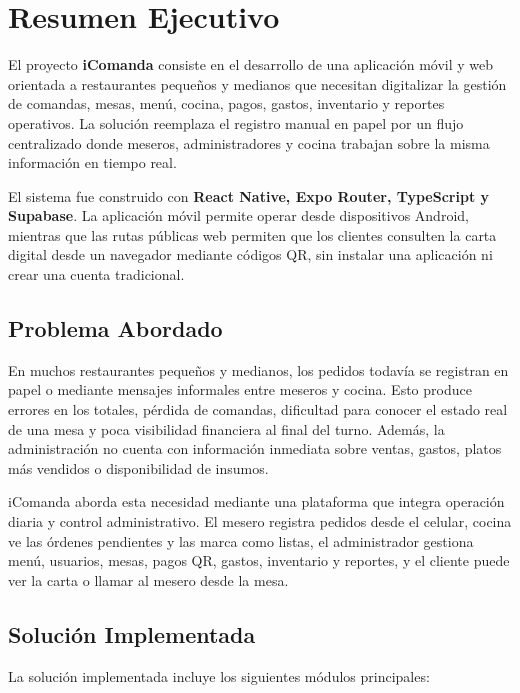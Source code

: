 \chapter{Resumen Ejecutivo}

El proyecto \textbf{iComanda} consiste en el desarrollo de una aplicación móvil
y web orientada a restaurantes pequeños y medianos que necesitan digitalizar la
gestión de comandas, mesas, menú, cocina, pagos, gastos, inventario y reportes
operativos. La solución reemplaza el registro manual en papel por un flujo
centralizado donde meseros, administradores y cocina trabajan sobre la misma
información en tiempo real.

El sistema fue construido con \textbf{React Native, Expo Router, TypeScript y
Supabase}. La aplicación móvil permite operar desde dispositivos Android, mientras
que las rutas públicas web permiten que los clientes consulten la carta digital
desde un navegador mediante códigos QR, sin instalar una aplicación ni crear una
cuenta tradicional.

\section{Problema Abordado}

En muchos restaurantes pequeños y medianos, los pedidos todavía se registran en
papel o mediante mensajes informales entre meseros y cocina. Esto produce errores
en los totales, pérdida de comandas, dificultad para conocer el estado real de una
mesa y poca visibilidad financiera al final del turno. Además, la administración
no cuenta con información inmediata sobre ventas, gastos, platos más vendidos o
disponibilidad de insumos.

iComanda aborda esta necesidad mediante una plataforma que integra operación diaria
y control administrativo. El mesero registra pedidos desde el celular, cocina ve
las órdenes pendientes y las marca como listas, el administrador gestiona menú,
usuarios, mesas, pagos QR, gastos, inventario y reportes, y el cliente puede ver
la carta o llamar al mesero desde la mesa.

\section{Solución Implementada}

La solución implementada incluye los siguientes módulos principales:

